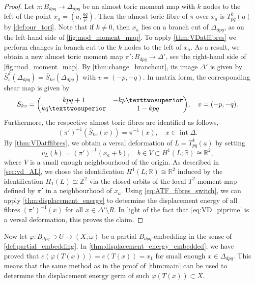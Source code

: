 \documentclass[12pt,a4paper,abstract=true,draft]{scrartcl}
\begin{document}
\begin{proof}
    Let $\pi \colon B_{dpq} \rightarrow \Delta_{dpq}$ be an almost toric moment map with $k$ nodes to the left of the point $x_a =\left( a, \frac{aq}{p}\right)$.
Then the almost toric fibre of $\pi$ over $x_a$ is $T^k_{pq}(a)$ by \cref{def:our_tori}.
Note that if $k \neq 0$, then $x_a$ lies on a branch cut of $\Delta_{dpq}$, as on the left-hand side of \cref{fig:mod_moment_map}.
To apply \cref{thm:VDatffibres} we perform changes in branch cut to the $k$ nodes to the left of $x_a$.
As a result, we obtain a new almost toric moment map $\pi' \colon B_{dpq} \rightarrow \Delta'$, see the right-hand side of \cref{fig:mod_moment_map}.
By \cref{thm:change_branchcut}, its image $\Delta'$ is given by $\overline{S}_v^k (\Delta_{dpq}) = \overline{S}_{kv}(\Delta_{dpq})$ with $v = (-p,-q)$.
In matrix form, the corresponding shear map is given by 
    \begin{equation}
        \label{eq:displacement_energy_germ}
        S_{kv} = 
        \mqty(kpq+1 & -kp²\\ kq² & 1-kpq), \quad
        v = (-p,-q).
    \end{equation}
    Furthermore, the respective almost toric fibres are identified as follows,
    \begin{equation}
        \label{eq:ATF_fibres_switch}
        (\pi')^{-1}(\overline{S}_{kv}(x)) = \pi^{-1}(x), \quad
        x \in \operatorname{int} \Delta.
    \end{equation}
    By \cref{thm:VDatffibres}, we obtain a versal deformation of $L =T^k_{pq}(a)$ by setting
    \begin{equation}
        \label{eq:VD_piprime}
        v_L(b) = (\pi')^{-1}(x_a + b), \quad
        b \in V \subset H^1(L; \mathbb{R}) \cong \mathbb{R}^2,
    \end{equation}
    where $V$ is a small enough neighbourhood of the origin.
As described in \cref{sec:vd_AL}, we chose the identification $H^1(L; \mathbb{R}) \cong \mathbb{R}^2$ induced by the identification $H_1(L) \cong \mathbb{Z}^2$ via the closed orbits of the local $T^2$-moment map defined by $\pi'$ in a neighbourhood of $x_a$.
Using \eqref{eq:ATF_fibres_switch}, we can apply \cref{thm:displacement_energy} to determine the displacement energy of all fibres $(\pi')^{-1}(x)$ for all $x \in \Delta' \setminus R$.
In light of the fact that \eqref{eq:VD_piprime} is a versal deformation, this proves the claim.
\end{proof}

Now let $\varphi \colon B_{dpq} \supset U \rightarrow (X,\omega)$ be a partial $B_{dpq}$-embedding in the sense of \cref{def:partial_embedding}.
In \cref{thm:displacement_energy_embedded}, we have proved that $e(\varphi(T(x))) = e(T(x)) = x_1$ for small enough $x \in \Delta_{dpq}$.
This means that the same method as in the proof of \cref{thm:main} can be used to determine the displacement energy germ of such $\varphi(T(x)) \subset X$. 
\end{document}
